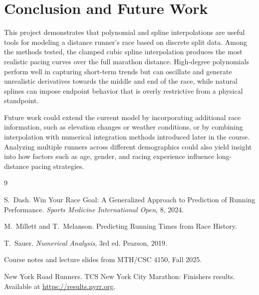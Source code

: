 \documentclass[12pt]{article}
\begin{document}
\section{Conclusion and Future Work}

This project demonstrates that polynomial and spline interpolations are
useful tools for modeling a distance runner's race based on discrete
split data. Among the methods tested, the clamped cubic spline
interpolation produces the most realistic pacing curves over the full
marathon distance. High-degree polynomials perform well in capturing
short-term trends but can oscillate and generate unrealistic derivatives
towards the middle and end of the race, while natural splines can impose
endpoint behavior that is overly restrictive from a physical standpoint.

Future work could extend the current model by incorporating additional
race information, such as elevation changes or weather conditions, or by
combining interpolation with numerical integration methods introduced
later in the course. Analyzing multiple runners across different
demographics could also yield insight into how factors such as age,
gender, and racing experience influence long-distance pacing strategies.

\newpage
\begin{thebibliography}{9}

S.~Dash.
\newblock Win Your Race Goal: A Generalized Approach to Prediction of Running
Performance.
\newblock \emph{Sports Medicine International Open}, 8, 2024.

M.~Millett and T.~Melanson.
\newblock Predicting Running Times from Race History.

T.~Sauer.
\newblock \emph{Numerical Analysis}, 3rd ed.
\newblock Pearson, 2019.

Course notes and lecture slides from MTH/CSC 4150, Fall 2025.

New York Road Runners.
 TCS New York City Marathon: Finishers results.
\newblock Available at \url{https://results.nyrr.org}.

\end{thebibliography}
\end{document}
